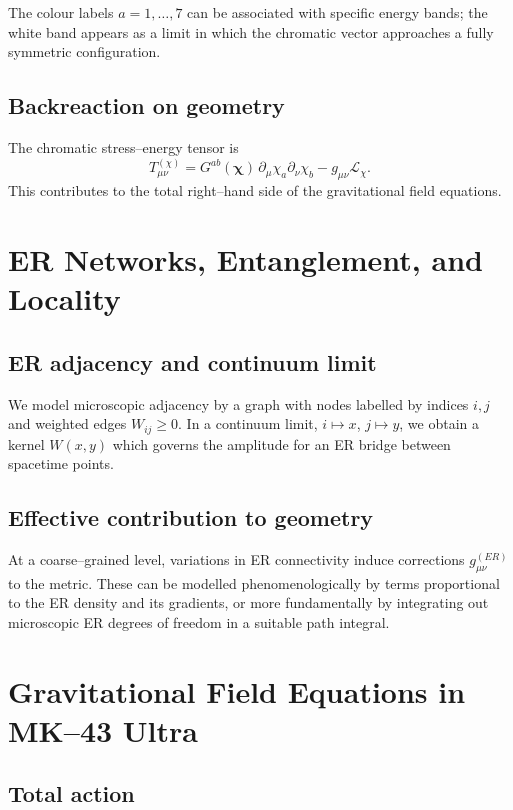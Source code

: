 \documentclass[11pt]{book}
\begin{document}
The colour labels $a=1,\dots,7$ can be associated with specific energy bands; the white band appears as a limit in which the chromatic vector approaches a fully symmetric configuration.

\section{Backreaction on geometry}

The chromatic stress--energy tensor is
\begin{equation}
  T^{(\chi)}_{\mu\nu}
  =
  G^{ab}(\bm{\chi})\, \partial_\mu\chi_a \partial_\nu\chi_b
  - g_{\mu\nu}\mathcal{L}_\chi.
\end{equation}
This contributes to the total right--hand side of the gravitational field equations.

\chapter{ER Networks, Entanglement, and Locality}

\section{ER adjacency and continuum limit}

We model microscopic adjacency by a graph with nodes labelled by indices $i,j$ and weighted edges $W_{ij}\ge 0$.
In a continuum limit, $i\mapsto x$, $j\mapsto y$, we obtain a kernel $W(x,y)$ which governs the amplitude for an ER bridge between spacetime points.

\section{Effective contribution to geometry}

At a coarse--grained level, variations in ER connectivity induce corrections $g^{(ER)}_{\mu\nu}$ to the metric.
These can be modelled phenomenologically by terms proportional to the ER density and its gradients, or more fundamentally by integrating out microscopic ER degrees of freedom in a suitable path integral.

\chapter{Gravitational Field Equations in MK--43 Ultra}

\section{Total action}
\end{document}
